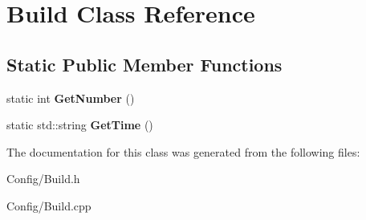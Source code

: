 \hypertarget{class_build}{
\section{\-Build \-Class \-Reference}
\label{class_build}
}
\subsection*{\-Static \-Public \-Member \-Functions}
\begin{DoxyCompactItemize}
\item 
\hypertarget{class_build_a9f5d52e1840e568016036c34124da091}{
static int {\bfseries \-Get\-Number} ()}
\label{class_build_a9f5d52e1840e568016036c34124da091}

\item 
\hypertarget{class_build_a129bada4f288e35d2340e157f6414c1f}{
static std\-::string {\bfseries \-Get\-Time} ()}
\label{class_build_a129bada4f288e35d2340e157f6414c1f}

\end{DoxyCompactItemize}


\-The documentation for this class was generated from the following files\-:\begin{DoxyCompactItemize}
\item 
\-Config/\-Build.\-h\item 
\-Config/\-Build.\-cpp\end{DoxyCompactItemize}
